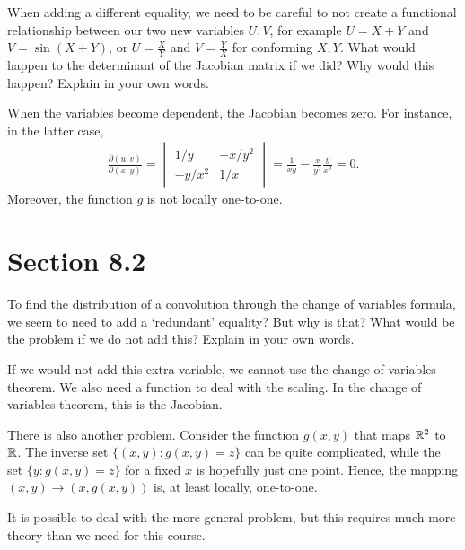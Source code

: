\begin{exercise}
When adding a different equality, we need to be careful to not create a functional relationship between our two new variables $U,V$, for example $U=X+Y$ and $V=\sin(X+Y)$, or $U=\frac X Y$ and $V = \frac Y X$ for conforming $X,Y$.
What would happen to the determinant of the Jacobian matrix if we did?
Why would this happen?
Explain in your own words.
\begin{solution}
  When the variables become dependent, the Jacobian becomes zero. For instance,  in the latter case,
\begin{align}
\frac{\partial (u,v)}{\partial (x, y)} =
  \begin{vmatrix}
    1/y & -x/y^{2} \\
-y/x^{2} & 1/x
  \end{vmatrix} = \frac{1}{x y} - \frac{x}{y^2}\frac{y}{x^{2}} = 0.
\end{align}
Moreover, the function $g$ is not locally one-to-one.

\end{solution}
\end{exercise}


\section{Section 8.2}
\label{sec:section-8.2}


\begin{exercise}
To find the distribution of a convolution through the change of variables formula, we seem to need to add a `redundant' equality?
But why is that?
What would be the problem if we do not add this?
Explain in your own words.
\begin{solution}
If we would not add this extra variable, we cannot use the change of variables theorem. We also need a function to deal with the scaling. In the change of variables theorem, this is the Jacobian.

There is also another problem.
Consider the function $g(x, y)$ that maps $\mathbb{R}^{2}$ to $\mathbb{R}$.
The inverse set $\{ (x,y) : g(x,y) =z \}$ can be quite complicated, while the set $\{y : g(x, y) = z\}$ for a fixed $x$ is hopefully just one point.
Hence, the mapping $(x, y) \to (x, g(x,y))$ is, at least locally, one-to-one.

It is possible to deal with the more general problem, but this requires much more theory than we need for this course.
\end{solution}
\end{exercise}


